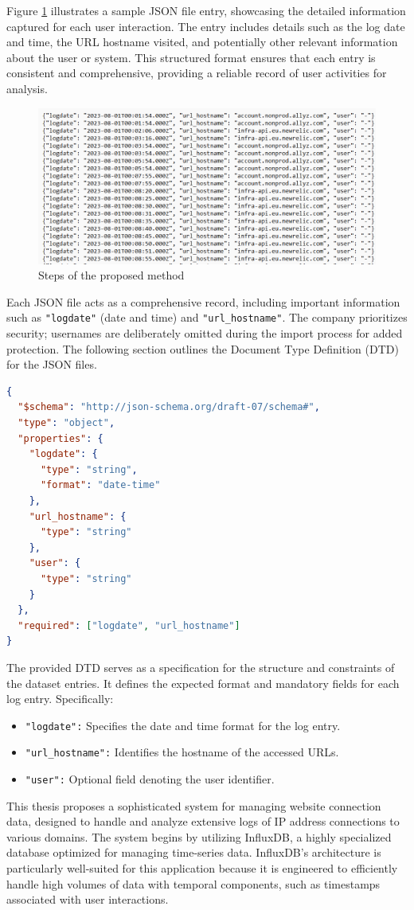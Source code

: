 Figure \ref{fig:jsondata} illustrates a sample JSON file entry, showcasing the detailed information captured for each user interaction. The entry includes  details such as the log date and time, the URL hostname visited, and potentially other relevant information about the user or system. This structured format ensures that each entry is consistent and comprehensive, providing a reliable record of user activities for analysis.

\begin{figure}
    \centering
    \includegraphics[width=.8\linewidth]{../Thesis_Docs/media/jsondata.png}
    \caption{Steps of the proposed method}
    \label{fig:jsondata}
\end{figure}

Each JSON file acts as a comprehensive record, including important information such as \texttt{"logdate"} (date and time) and \texttt{"url\_hostname"}.  The company prioritizes security; usernames are deliberately omitted during the import process for added protection. The following section outlines the Document Type Definition (DTD) for the JSON files.

\begin{lstlisting}[language=json]
{
  "$schema": "http://json-schema.org/draft-07/schema#",
  "type": "object",
  "properties": {
    "logdate": {
      "type": "string",
      "format": "date-time"
    },
    "url_hostname": {
      "type": "string"
    },
    "user": {
      "type": "string"
    }
  },
  "required": ["logdate", "url_hostname"]
}
\end{lstlisting}
The provided DTD serves as a specification for the structure and constraints of the dataset entries. It defines the expected format and mandatory fields for each log entry. Specifically:
\begin{itemize}
    \item \texttt{"logdate":} Specifies the date and time format for the log entry.
    \item \texttt{"url\_hostname":} Identifies the hostname of the accessed URLs.
    \item \texttt{"user":} Optional field denoting the user identifier.
\end{itemize}
This thesis proposes a sophisticated system for managing website connection data, designed to handle and analyze extensive logs of IP address connections to various domains. The system begins by utilizing InfluxDB, a highly specialized database optimized for managing time-series data. InfluxDB’s architecture is particularly well-suited for this application because it is engineered to efficiently handle high volumes of data with temporal components, such as timestamps associated with user interactions.

